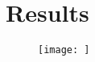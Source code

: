 \section{Results}
\label{sec:results}

\begin{figure}[htbp]
	\centering
	\texttt{[image: ]}
	\caption{}
	\label{fig:}
\end{figure}



